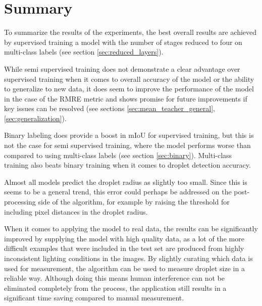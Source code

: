 \section{Summary}

To summarize the results of the experiments, the best overall results are achieved by supervised training a model with the number of stages reduced to four on multi-class labels (see section \ref{sec:reduced_layers}).

While semi supervised training does not demonstrate a clear advantage over supervised training when it comes to overall accuracy of the model or the ability to generalize to new data, it does seem to improve the performance of the model in the case of the RMRE metric and shows promise for future improvements if key issues can be resolved (see sections \ref{sec:mean_teacher_general}, \ref{sec:generalization}).

Binary labeling does provide a boost in mIoU for supervised training, but this is not the case for semi supervised training, where the model performs worse than compared to using multi-class labels (see section \ref{sec:binary}).
Multi-class training also beats binary training when it comes to droplet detection accuracy.

Almost all models predict the droplet radius as slightly too small. Since this is seems to be a general trend, this error could perhaps be addressed on the post-processing side of the algorithm, for example by raising the threshold for including pixel distances in the droplet radius.

When it comes to applying the model to real data, the results can be significantly improved by supplying the model with high quality data, as a lot of the more difficult examples that were included in the test set are produced from highly inconsistent lighting conditions in the images.
By slightly curating which data is used for measurement, the algorithm can be used to measure droplet size in a reliable way.
Although doing this means human interference can not be eliminated completely from the process, the application still results in a significant time saving compared to manual measurement.